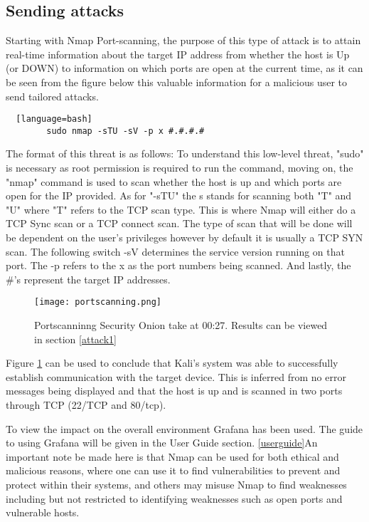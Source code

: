 \documentclass[12pt]{article}
\begin{document}
		
		\subsection{Sending attacks}
		
		
		Starting with Nmap Port-scanning, the purpose of this type of attack is to attain real-time information about the target IP address from whether the host is Up (or DOWN) to information on which ports are open at the current time, as it can be seen from the figure below this valuable information for a malicious user to send tailored attacks.
		
		\begin{lstlisting}  [language=bash]
		sudo nmap -sTU -sV -p x #.#.#.#
		\end{lstlisting}
		The format of this threat is as follows:
		To understand this low-level threat, "sudo" is necessary as root permission is required to run the command, moving on, the "nmap" command is used to scan whether the host is up and which ports are open for the IP provided. As for "-sTU" the s stands for scanning both "T" and "U" where "T" refers to the  TCP scan type. This is where Nmap will either do a TCP Sync scan or a TCP connect scan. The type of scan that will be done will be dependent on the user's privileges however by default it is usually a TCP SYN scan. The following switch -sV determines the service version running on that port. The -p refers to the x as the port numbers being scanned. And lastly, the \#'s represent the target IP addresses.
		
		
		
		\begin{center}
		\begin{figure}[H]
			\centering
			\texttt{[image: portscanning.png]}
			\caption{Portscanninng Security Onion take at 00:27. Results can be viewed in section \ref{attack1}} 
			\label{fig:29}
		\end{figure}
		\end{center}
		
		Figure \ref{fig:29} can be used to conclude that Kali's system was able to successfully establish communication with the target device. This is inferred from no error messages being displayed and that the host is up and is scanned in two ports through TCP (22/TCP and 80/tcp).
		
		To view the impact on the overall environment Grafana has been used. The guide to using Grafana will be given in the User Guide section. \ref{userguide}An important note be made here is that Nmap can be used for both ethical and malicious reasons, where one can use it to find vulnerabilities to prevent and protect within their systems, and others may misuse Nmap to find weaknesses including but not restricted to identifying weaknesses such as open ports and vulnerable hosts.
		
\end{document}
